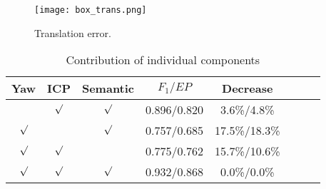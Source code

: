 \documentclass[letterpaper, 10 pt, conference]{ieeeconf}  %
\begin{document}

    \begin{figure}[t]
        \centering
            \texttt{[image: box\_trans.png]}
        \caption{Translation error.}
        \label{pic:trans}
     \end{figure}
     
\begin{table}[t]\footnotesize
    \caption{\centering Contribution of individual components}\vspace{-3mm}
    \label{table:Ablation}
    \begin{center}
    \begin{tabular}{c c c c c c c c}
    \hline
    Yaw & ICP & Semantic & \(F_1/EP\)&Decrease\\ 
    \hline
    ~&$\surd$&$\surd$&0.896/0.820&3.6\%/4.8\%\\
    $\surd$&~&$\surd$&0.757/0.685&17.5\%/18.3\%\\
    $\surd$&$\surd$&~&0.775/0.762&15.7\%/10.6\%\\
    $\surd$&$\surd$&$\surd$&0.932/0.868&0.0\%/0.0\%\\
    \hline
    \end{tabular}
    \end{center}
    \end{table}
\end{document}
